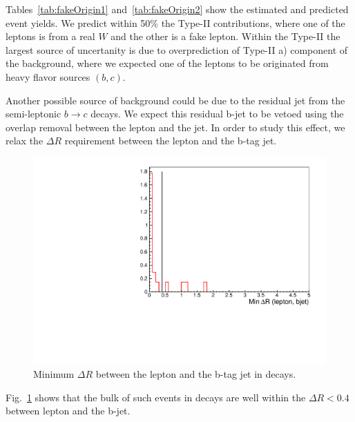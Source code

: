 Tables~\ref{tab:fakeOrigin1} and~\ref{tab:fakeOrigin2} show the estimated and predicted event yields. We predict within 50\% the Type-II contributions, where one of
the leptons is from a real $W$ and the other is a fake lepton. Within the Type-II the largest source of uncertanity is due to overprediction of Type-II a) 
component of the background, where we expected one of the leptons to be originated from heavy flavor sources $(b, c)$.

Another possible source of \ttbar background could be due to the residual jet from the semi-leptonic $b \rightarrow c$ decays. We expect this
residual b-jet to be vetoed using the overlap removal between the lepton and the jet. In order to study this effect, we relax the $\Delta R$
requirement between the lepton and the b-tag jet. 

\begin{figure}[htb]
\begin{center}
\includegraphics[width=0.6\linewidth, height=0.4\linewidth]{figs/bjetlepton.pdf}
\caption{ Minimum $\Delta R$ between the lepton and the b-tag jet in \ttbar decays.\label{fig:ttbar_residual}}
\end{center}
\end{figure}

Fig.~\ref{fig:ttbar_residual} shows that the bulk of such events in \ttbar decays are well within the $\Delta R < 0.4$ between lepton and the b-jet.



 




